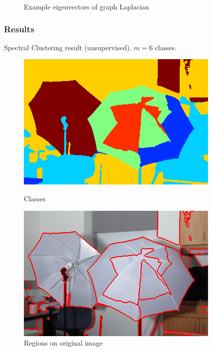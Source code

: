 \documentclass{beamer}
\begin{document}
\begin{frame}
\begin{figure}[ht]
\begin{minipage}[b]{0.40\linewidth}
    \end{minipage}
    \caption{Example eigenvectors of graph Laplacian}
  \end{figure}
\end{frame}


\begin{frame}
  \frametitle{Results}
  Spectral Clustering result (unsupervised). $m = 6$ classes.
  \begin{figure}[ht]
    \begin{minipage}[b]{0.45\linewidth}
      \centering
      \includegraphics[width=\textwidth]{./Images/Umbrella/classification.png}
      \caption{Classes}
    \end{minipage}
    \begin{minipage}[b]{0.45\linewidth}
      \centering
      \includegraphics[width=\textwidth]{./Images/Umbrella/imWithBorders.png}
      \caption{Regions on original image}
    \end{minipage}
  \end{figure}
\end{frame}
\end{document}

